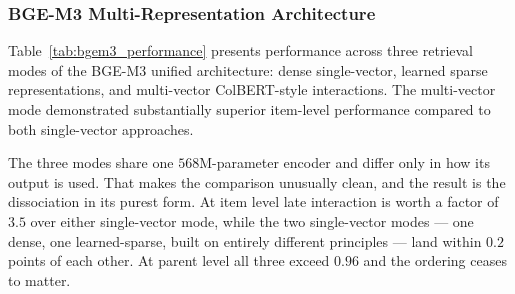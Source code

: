 \documentclass[preprint,12pt]{elsarticle}
\begin{document}
\subsubsection{BGE-M3 Multi-Representation Architecture}

Table~\ref{tab:bgem3_performance} presents performance across three retrieval modes of the BGE-M3 unified architecture: dense single-vector, learned sparse representations, and multi-vector ColBERT-style interactions. The multi-vector mode demonstrated substantially superior item-level performance compared to both single-vector approaches.

\begin{table}[htbp]
\centering
\caption{Performance comparison of BGE-M3 retrieval modes. All modes use the same base encoder (568M parameters) with mode-specific output layers.}
\label{tab:bgem3_performance}
\end{table}

The three modes share one $568$M-parameter encoder and differ only in how its output is used. That makes the comparison unusually clean, and the result is the dissociation in its purest form. At item level late interaction is worth a factor of $3.5$ over either single-vector mode, while the two single-vector modes --- one dense, one learned-sparse, built on entirely different principles --- land within $0.2$ points of each other. At parent level all three exceed $0.96$ and the ordering ceases to matter.
\end{document}
